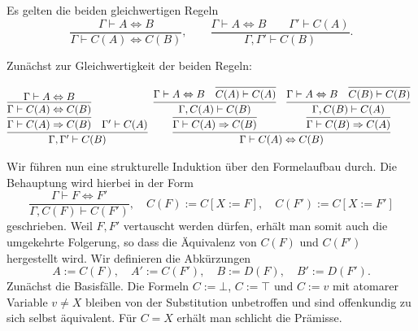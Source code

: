 \begin{Satz}%
\newlinefirst
Es gelten die beiden gleichwertigen Regeln
\[\dfrac{\Gamma\vdash A\Leftrightarrow B}
{\Gamma\vdash C(A)\Leftrightarrow C(B)},\qquad
\dfrac{\Gamma\vdash A\Leftrightarrow B\qquad\Gamma'\vdash C(A)}
{\Gamma,\Gamma'\vdash C(B)}.\]
\end{Satz}
\begin{Beweis}
Zunächst zur Gleichwertigkeit der beiden Regeln:
\begin{small}
\[
\begin{array}{@{}l@{\;\;}l}
\infer{\Gamma,\Gamma'\vdash C(B)}{
  \infer{\Gamma\vdash C(A)\cond C(B)}{
    \infer{\Gamma\vdash C(A)\bicond C(B)}{
      \Gamma\vdash A\bicond B}}
& \Gamma'\vdash C(A)}
&
\infer{\Gamma\vdash C(A)\bicond C(B)}{
  \infer{\Gamma\vdash C(A)\cond C(B)}{
    \infer{\Gamma, C(A)\vdash C(B)}{
      \Gamma\vdash A\bicond B
    & \infer{C(A)\vdash C(A)}{}}}
& \infer{\Gamma\vdash C(B)\cond C(A)}{
    \infer{\Gamma, C(B)\vdash C(A)}{
      \Gamma\vdash A\bicond B
    & \infer{C(B)\vdash C(B)}{}}}}
\end{array}
\]
\end{small}%
Wir führen nun eine strukturelle Induktion über den Formelaufbau durch.
Die Behauptung wird hierbei in der Form
\[\dfrac{\Gamma\vdash F\Leftrightarrow F'}{
\Gamma,C(F)\vdash C(F')},\quad C(F) := C[X:=F],\quad C(F') := C[X:=F']\]
geschrieben. Weil $F,F'$ vertauscht werden dürfen, erhält man somit auch
die umgekehrte Folgerung, so dass die Äquivalenz von $C(F)$ und $C(F')$
hergestellt wird. Wir definieren die Abkürzungen
\[A := C(F),\quad A' := C(F'),\quad B := D(F),\quad B' := D(F').\]
Zunächst die Basisfälle. Die Formeln $C:=\bot$,
$C:=\top$ und $C:=v$ mit atomarer Variable $v\ne X$
bleiben von der Substitution unbetroffen und sind offenkundig zu sich
selbst äquivalent. Für $C=X$ erhält man schlicht die Prämisse.


\end{Beweis}

